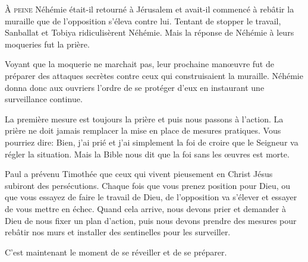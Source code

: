 


\lettrine{À}{ peine} Néhémie était-il retourné à Jérusalem
 et avait-il commencé à rebâtir la muraille que de l'opposition
 s'éleva contre lui.
 Tentant de stopper le travail, Sanballat et Tobiya ridiculisèrent Néhémie.
 Mais la réponse de Néhémie à leurs moqueries fut la prière.

Voyant que la moquerie ne marchait pas, leur prochaine man\oe{}uvre
 fut de préparer des attaques secrètes contre ceux qui construisaient
 la muraille.
 Néhémie donna donc aux ouvriers l'ordre de se protéger d'eux en instaurant
 une surveillance continue.

La première mesure est toujours la prière \ocadr{}et puis nous passons à l'action.
 La prière ne doit jamais remplacer la mise en place de mesures pratiques.
 Vous pourriez dire:
 \Og Bien, j'ai prié et j'ai simplement la foi de croire que le Seigneur
 va régler la situation. \Fg{}
 Mais la Bible nous dit que la foi sans les \oe{}uvres est morte.


Paul a prévenu Timothée que ceux qui vivent pieusement en Christ Jésus
 subiront des persécutions.
 Chaque fois que vous prenez position pour Dieu,
 ou que vous essayez de faire le travail de Dieu,
 de l'opposition va s'élever et essayer de vous mettre en échec.
 Quand cela arrive, nous devons prier et demander à Dieu de nous fixer
 un plan d'action, puis nous devons prendre des mesures pour rebâtir
 nos murs et installer des sentinelles pour les surveiller.

C'est maintenant le moment de se réveiller et de se préparer. 


\dvrule






